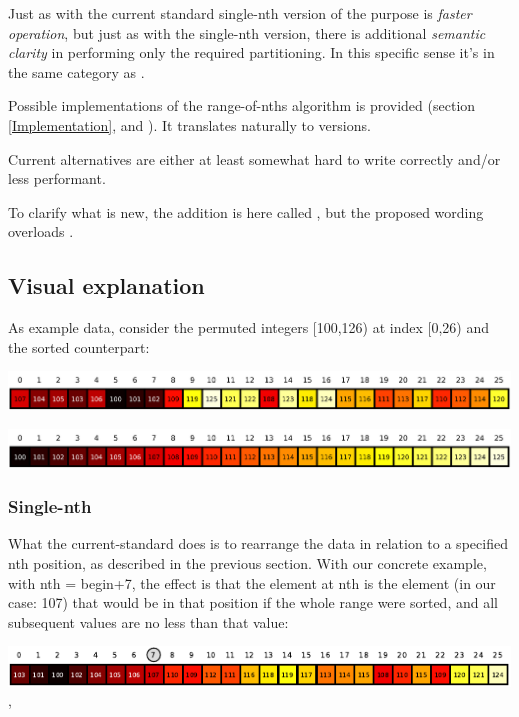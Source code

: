 Just as with the current standard single-nth version of  the purpose is \emph{faster operation}, but just as with the single-nth version, there is additional \emph{semantic clarity} in performing only the required partitioning. 
In this specific sense it's in the same category as .

Possible implementations of the range-of-nths algorithm is provided (section \ref{Implementation}, and \cite{p2375RefImpl}).
It translates naturally to  versions.

Current alternatives are either at least somewhat hard to write correctly and/or less performant.

To clarify what is new, the addition is here called , but the proposed wording overloads . 

\newpage
\subsection{Visual explanation}

As example data, consider the permuted integers [100,126) at index [0,26) and the sorted counterpart:

\includegraphics[width=0.999\textwidth]{plotting/figs/rnd.png}

\includegraphics[width=0.999\textwidth]{plotting/figs/sort.png}

\subsubsection*{Single-nth }

What the current-standard  does is to rearrange the data in relation to a specified nth position, as described in the previous section. With our concrete example, with {nth = begin+7}, the effect is that the element at nth is the element (in our case: 107) that  would  be  in  that position if the whole range were sorted, and all subsequent values are no less than that value:

\includegraphics[width=0.999\textwidth]{plotting/figs/1a.pdf},

